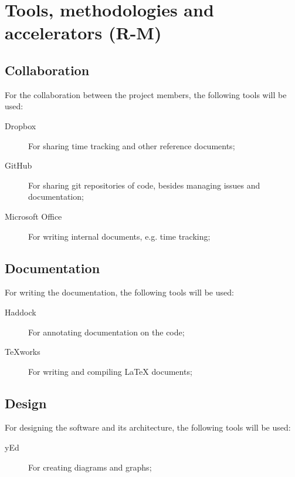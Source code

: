 \section{Tools, methodologies and accelerators (R-M)}
\label{sec:tools-methodologies}

\subsection{Collaboration}
%
%
%
%
For the collaboration between the project members, the following tools will be used:
\begin{description}
	\item[Dropbox] For sharing time tracking and other reference documents;
	\item[GitHub] For sharing git repositories of code, besides managing issues and documentation;
	\item[Microsoft Office] For writing internal documents, e.g. time tracking;
\end{description}

\subsection{Documentation}
%
%
%
For writing the documentation, the following tools will be used:
\begin{description}
	\item[Haddock] For annotating documentation on the code;
	\item[TeXworks] For writing and compiling \LaTeX{} documents;
\end{description}

\subsection{Design}
%
For designing the software and its architecture, the following tools will be used:
\begin{description}
	\item[yEd] For creating diagrams and graphs;
\end{description}

